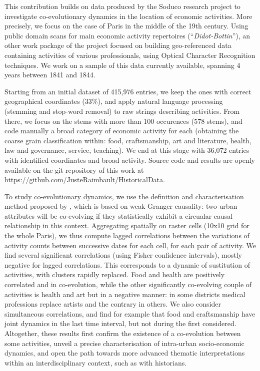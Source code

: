 \documentclass[a4paper]{article}
\begin{document}
This contribution builds on data produced by the Soduco research project \cite{soduco} to investigate co-evolutionary dynamics in the location of economic activities. More precisely, we focus on the case of Paris in the middle of the 19th century. Using public domain scans for main economic activity repertoires (``\textit{Didot-Bottin}''), an other work package of the project focused on building geo-referenced data containing activities of various professionals, using Optical Character Recognition techniques. We work on a sample of this data currently available, spanning 4 years between 1841 and 1844.

Starting from an initial dataset of 415,976 entries, we keep the ones with correct geographical coordinates (33\%), and apply natural language processing (stemming and stop-word removal) to raw strings describing activities. From there, we focus on the stems with more than 100 occurences (578 stems), and code manually a broad category of economic activity for each (obtaining the coarse grain classification within: food, craftsmanship, art and literature, health, law and governance, service, teaching). We end at this stage with 36,072 entries with identified coordinates and broad activity. Source code and results are openly available on the git repository of this work at \url{https://github.com/JusteRaimbault/HistoricalData}.

To study co-evolutionary dynamics, we use the definition and characterisation method proposed by \cite{raimbault2021characterising}, which is based on weak Granger causality: two urban attributes will be co-evolving if they statistically exhibit a circualar causal relationship in this context. Aggregating spatially on raster cells (10x10 grid for the whole Paris), we thus compute lagged correlations between the variations of activity counts between successive dates for each cell, for each pair of activity. We find several significant correlations (using Fisher confidence intervals), mostly negative for lagged correlations. This corresponds to a dynamic of sustitution of activities, with clusters rapidly replaced. Food and health are positively correlated and in co-evolution, while the other significantly co-evolving couple of activities is health and art but in a negative manner: in some districts medical professions replace artists and the contrary in others. We also consider simultaneous correlations, and find for example that food and craftsmanship have joint dynamics in the last time interval, but not during the first considered. Altogether, these results first confirm the existence of a co-evolution between some activities, unveil a precise characterisation of intra-urban socio-economic dynamics, and open the path towards more advanced thematic interpretations within an interdisciplinary context, such as with historians.
\end{document}
